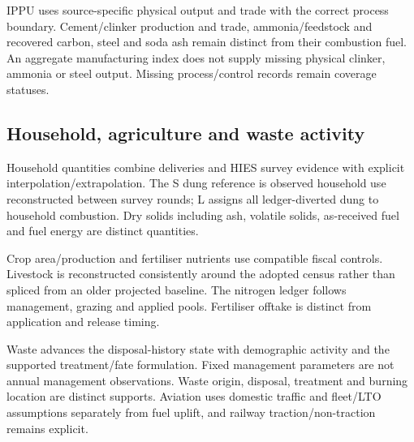 IPPU uses source-specific physical output and trade with the correct process boundary. Cement/clinker production and trade, ammonia/feedstock and recovered carbon, steel and soda ash remain distinct from their combustion fuel. An aggregate manufacturing index does not supply missing physical clinker, ammonia or steel output. Missing process/control records remain coverage statuses.

\subsection{Household, agriculture and waste activity}
Household quantities combine deliveries and HIES survey evidence with explicit interpolation/extrapolation. The S dung reference is observed household use reconstructed between survey rounds; L assigns all ledger-diverted dung to household combustion. Dry solids including ash, volatile solids, as-received fuel and fuel energy are distinct quantities.

Crop area/production and fertiliser nutrients use compatible fiscal controls. Livestock is reconstructed consistently around the adopted census rather than spliced from an older projected baseline. The nitrogen ledger follows management, grazing and applied pools. Fertiliser offtake is distinct from application and release timing.

Waste advances the disposal-history state with demographic activity and the supported treatment/fate formulation. Fixed management parameters are not annual management observations. Waste origin, disposal, treatment and burning location are distinct supports. Aviation uses domestic traffic and fleet/LTO assumptions separately from fuel uplift, and railway traction/non-traction remains explicit.
